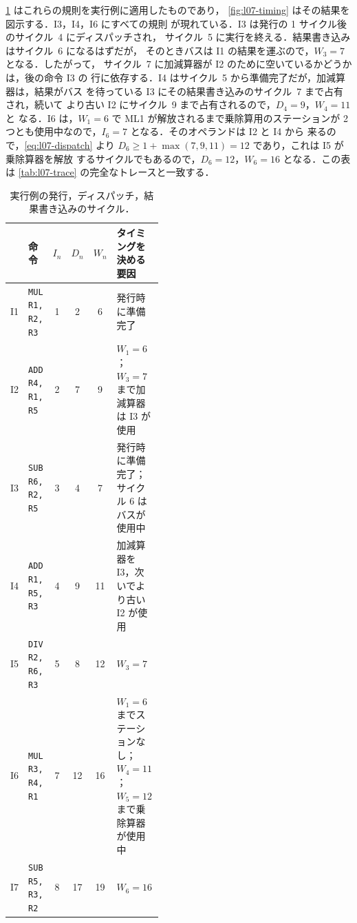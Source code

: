 \documentclass[../main.tex]{subfiles}
\begin{document}
\begin{example}
  \label{ex:l07-timing}
  \cref{tab:l07-timing} はこれらの規則を実行例に適用したものであり，
  \cref{fig:l07-timing} はその結果を図示する．I3，I4，I6 にすべての規則
  が現れている．I3 は発行の 1 サイクル後のサイクル~4 にディスパッチされ，
  サイクル~5 に実行を終える．結果書き込みはサイクル~6 になるはずだが，
  そのときバスは I1 の結果を運ぶので，$W_3 = 7$ となる．したがって，
  サイクル~7 に加減算器が I2 のために空いているかどうかは，後の命令 I3 の
  行に依存する．I4 はサイクル~5 から準備完了だが，加減算器は，結果がバス
  を待っている I3 にその結果書き込みのサイクル~7 まで占有され，続いて
  より古い I2 にサイクル~9 まで占有されるので，$D_4 = 9$，$W_4 = 11$ と
  なる．I6 は，$W_1 = 6$ で ML1 が解放されるまで乗除算用のステーションが
  2つとも使用中なので，$I_6 = 7$ となる．そのオペランドは I2 と I4 から
  来るので，\cref{eq:l07-dispatch} より
  $D_6 \ge 1 + \max(7, 9, 11) = 12$ であり，これは I5 が乗除算器を解放
  するサイクルでもあるので，$D_6 = 12$，$W_6 = 16$ となる．この表は
  \cref{tab:l07-trace} の完全なトレースと一致する．
\end{example}

\begin{table}[htbp]
  \centering\small
  \caption{実行例の発行，ディスパッチ，結果書き込みのサイクル．}
  \label{tab:l07-timing}
  \begin{tabular}{@{}llccc>{\raggedright\arraybackslash}p{0.44\linewidth}@{}}
    \toprule
    & 命令 & $I_n$ & $D_n$ & $W_n$ & タイミングを決める要因 \\
    \midrule
    I1 & \texttt{MUL R1, R2, R3} & 1 & 2  & 6  & 発行時に準備完了 \\
    I2 & \texttt{ADD R4, R1, R5} & 2 & 7  & 9  & $W_1 = 6$；$W_3 = 7$ まで加減算器は I3 が使用 \\
    I3 & \texttt{SUB R6, R2, R5} & 3 & 4  & 7  & 発行時に準備完了；サイクル 6 はバスが使用中 \\
    I4 & \texttt{ADD R1, R5, R3} & 4 & 9  & 11 & 加減算器を I3，次いでより古い I2 が使用 \\
    I5 & \texttt{DIV R2, R6, R3} & 5 & 8  & 12 & $W_3 = 7$ \\
    I6 & \texttt{MUL R3, R4, R1} & 7 & 12 & 16 & $W_1 = 6$ までステーションなし；
                                               $W_4 = 11$；$W_5 = 12$ まで乗除算器が使用中 \\
    I7 & \texttt{SUB R5, R3, R2} & 8 & 17 & 19 & $W_6 = 16$ \\
    \bottomrule
  \end{tabular}
\end{table}
\end{document}
